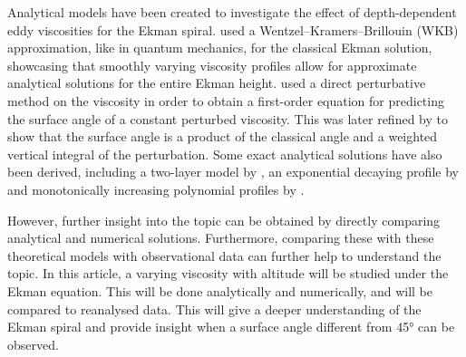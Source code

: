 Analytical models have been created to investigate the effect of depth-dependent eddy viscosities for the Ekman spiral. \citet{grisogono1995} used a Wentzel--Kramers--Brillouin (WKB) approximation, like in quantum mechanics, for the classical Ekman solution, showcasing that smoothly varying viscosity profiles allow for approximate analytical solutions for the entire Ekman height. \citet{bressan2019} used a direct perturbative method on the viscosity in order to obtain a first-order equation for predicting the surface angle of a constant perturbed viscosity. This was later refined by \citet{constantin2021} to show that the surface angle is a product of the classical angle and a weighted vertical integral of the perturbation. Some exact analytical solutions have also been derived, including a two-layer model by \citet{dritschel2020, guan2023}, an exponential decaying profile by \citet{miles1994} and monotonically increasing polynomial profiles by \citet{ionescu-kruse2021,guan2023}.

However, further insight into the topic can be obtained by directly comparing analytical and numerical solutions. Furthermore, comparing these with these theoretical models with observational data can further help to understand the topic. In this article, a varying viscosity with altitude will be studied under the Ekman equation. This will be done analytically and numerically, and will be compared to reanalysed data. This will give a deeper understanding of the Ekman spiral and provide insight when a surface angle different from \ang{45} can be observed.